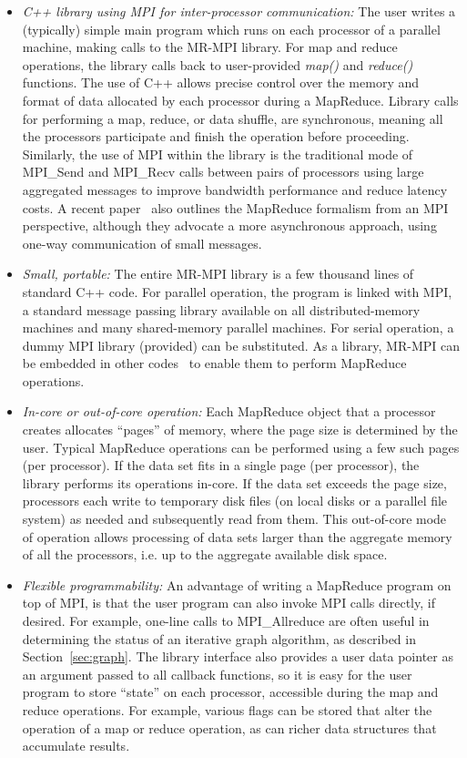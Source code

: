 \begin{itemize}

\item {\it C++ library using MPI for inter-processor communication:}
The user writes a (typically) simple main program which runs on each
processor of a parallel machine, making calls to the MR-MPI library.
For map and reduce operations, the library calls back to user-provided
{\it map()} and {\it reduce()} functions.  The use of C++ allows
precise control over the memory and format of data allocated by each
processor during a MapReduce.  Library calls for performing a map,
reduce, or data shuffle, are synchronous, meaning all the processors
participate and finish the operation before proceeding.  Similarly,
the use of MPI within the library is the traditional mode of MPI\_Send
and MPI\_Recv calls between pairs of processors using large aggregated
messages to improve bandwidth performance and reduce latency costs.  A
recent paper~\cite{Hoefler09} also outlines the MapReduce formalism
from an MPI perspective, although they advocate a more asynchronous
approach, using one-way communication of small messages.

\item {\it Small, portable:} The entire MR-MPI library is a few
thousand lines of standard C++ code.  For parallel operation, the
program is linked with MPI, a standard message passing library
available on all distributed-memory machines and many shared-memory
parallel machines.  For serial operation, a dummy MPI library
(provided) can be substituted.  As a library, MR-MPI can be embedded
in other codes~\cite{Titan} to enable them to perform MapReduce
operations.

\item {\it In-core or out-of-core operation:} Each MapReduce object
that a processor creates allocates ``pages'' of memory, where the page
size is determined by the user.  Typical MapReduce operations can be
performed using a few such pages (per processor).  If the data set
fits in a single page (per processor), the library performs its
operations in-core.  If the data set exceeds the page size, processors
each write to temporary disk files (on local disks or a parallel file
system) as needed and subsequently read from them.  This out-of-core
mode of operation allows processing of data sets larger than the
aggregate memory of all the processors, i.e. up to the aggregate
available disk space.

\item {\it Flexible programmability:} An advantage of writing a
MapReduce program on top of MPI, is that the user program can also
invoke MPI calls directly, if desired.  For example, one-line calls to
MPI\_Allreduce are often useful in determining the status of an
iterative graph algorithm, as described in Section~\ref{sec:graph}.
The library interface also provides a user data pointer as an argument
passed to all callback functions, so it is easy for the user program
to store ``state'' on each processor, accessible during the map and
reduce operations.  For example, various flags can be stored that
alter the operation of a map or reduce operation, as can richer data
structures that accumulate results.


\end{itemize}
